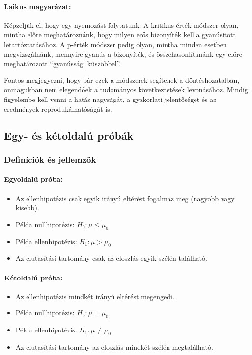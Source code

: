 \documentclass[a4paper,12pt]{article}
\begin{document}
    \paragraph{Laikus magyarázat:} Képzeljük el, hogy egy nyomozást folytatunk. A kritikus érték módszer olyan, mintha előre meghatároznánk, hogy milyen erős bizonyíték kell a gyanúsított letartóztatásához. A p-érték módszer pedig olyan, mintha minden esetben megvizsgálnánk, mennyire gyanús a bizonyíték, és összehasonlítanánk egy előre meghatározott ``gyanússági küszöbbel''.

    Fontos megjegyezni, hogy bár ezek a módszerek segítenek a döntéshozatalban, önmagukban nem elegendőek a tudományos következtetések levonásához. Mindig figyelembe kell venni a hatás nagyságát, a gyakorlati jelentőséget és az eredmények reprodukálhatóságát is.

    \subsection{Egy- és kétoldalú próbák}

    \subsubsection{Definíciók és jellemzők}

    \paragraph{Egyoldalú próba:}
    \begin{itemize}
        \item Az ellenhipotézis csak egyik irányú eltérést fogalmaz meg (nagyobb vagy kisebb).
        \item Példa nullhipotézis: $H_0: \mu \leq \mu_0$
        \item Példa ellenhipotézis: $H_1: \mu > \mu_0$
        \item Az elutasítási tartomány csak az eloszlás egyik szélén található.
    \end{itemize}

    \paragraph{Kétoldalú próba:}
    \begin{itemize}
        \item Az ellenhipotézis mindkét irányú eltérést megengedi.
        \item Példa nullhipotézis: $H_0: \mu = \mu_0$
        \item Példa ellenhipotézis: $H_1: \mu \neq \mu_0$
        \item Az elutasítási tartomány az eloszlás mindkét szélén megtalálható.
    \end{itemize}
\end{document}
